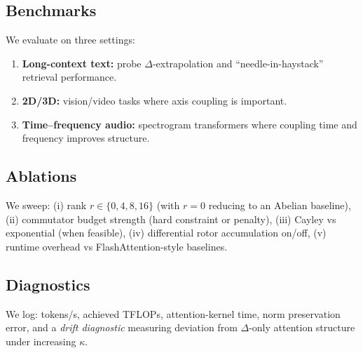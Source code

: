 \subsection{Benchmarks}
We evaluate on three settings:
\begin{enumerate}
  \item \textbf{Long-context text:} probe $\Delta$-extrapolation and ``needle-in-haystack'' retrieval performance.
  \item \textbf{2D/3D:} vision/video tasks where axis coupling is important.
  \item \textbf{Time--frequency audio:} spectrogram transformers where coupling time and frequency improves structure.
\end{enumerate}

\subsection{Ablations}
We sweep:
(i) rank $r\in\{0,4,8,16\}$ (with $r=0$ reducing to an Abelian baseline),
(ii) commutator budget strength (hard constraint or penalty),
(iii) Cayley vs exponential (when feasible),
(iv) differential rotor accumulation on/off,
(v) runtime overhead vs FlashAttention-style baselines.

\subsection{Diagnostics}
We log:
tokens/s, achieved TFLOPs, attention-kernel time, norm preservation error, and a \emph{drift diagnostic} measuring deviation from $\Delta$-only attention structure under increasing $\kappa$.
